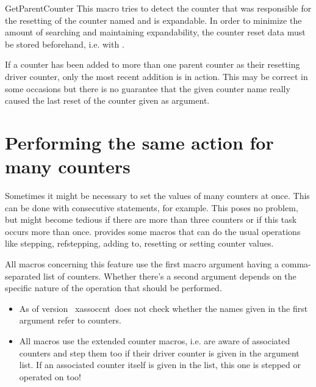 \documentclass[12pt,a4paper,oneside]{article}
\makeatletter
\newcommand{\chdocextractversion}[1]{%
  \@nameuse{#1}%
}
\newcommand{\CHDocNew}[1]{%
  \tcbdocmarginnote[doclang/new={N},
  colframe=blue,
  halign=left,
  colback={blue!20!white},
  fontupper={\tiny}
  ]{%
    \chdocextractversion{xassoccntversion#1}%
  }%
}
\newcommand{\CHDocExpCommand}[1][Expandable]{%
  \tcbdocmarginnote[doclang/new={N},
  colframe=green!50!blue,
  halign=left,
  colback={green!90!blue},
  fontupper={\tiny}
  ]{%
    #1%
  }%
}
\newcommand{\PackageDocName}{xassoccnt}%
\def\packageversion{\xassoccntpackageversion}%
\makeatother
\begin{document}
\begin{docCommand}[before={\CHDocExpCommand\par\CHDocNew{1.3}}]{GetParentCounter}{}
This macro tries to detect the counter that was responsible for the resetting of the counter named  and is expandable. 
In order to minimize the amount of searching and maintaining expandability, the counter reset data must be stored beforehand, i.e. with . 

\begin{marker} 
If a counter has been added to more than one parent counter as their resetting driver counter, only the most recent addition is in action. This may be correct in some occasions but there is no guarantee that the given counter name really caused the last reset of the counter given as argument. 
\end{marker}
\end{docCommand}



\section[Loops on multiple counters]{Performing the same action for many counters} \CHDocNew{0.7}

Sometimes it might be necessary to set the values of many counters at once. This can be done with consecutive  statements, for example. This poses no problem, but might become tedious if there are more than three counters or if this task occurs more than once. \CHDocPackage{\PackageDocName} provides some macros that can do the usual operations like stepping, refstepping, adding to, resetting or setting counter values. 


All macros concerning this feature use the first macro argument having a comma-separated list of counters. Whether there's a second argument depends on the specific nature of the operation that should be performed. 

\begin{marker}
\begin{itemize}
\item As of version \packageversion\ \PackageDocName\ does not check whether the names given in the first argument refer to counters. 
\item All macros use the extended counter macros, i.e. are aware of associated counters and step them too if their driver counter is given in the argument list. If an associated counter itself is given in the list, this one is stepped or operated on too!
\end{itemize}
\end{marker}
\end{document}
